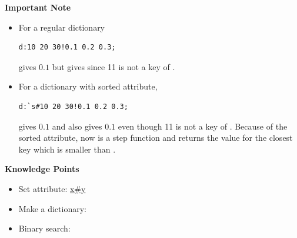 \begin{importantblock}
\textbf{Important Note}
\begin{itemize}
\item For a regular dictionary 
\begin{verbatim}
d:10 20 30!0.1 0.2 0.3;
\end{verbatim}
 gives $0.1$ but  gives  since 11 is not a key of .

\item For a dictionary with sorted attribute,
\begin{verbatim}
d:`s#10 20 30!0.1 0.2 0.3;
\end{verbatim}
 gives $0.1$ and  also gives $0.1$ even though 11 is not a key of . Because of the sorted attribute,  now is a step function and  returns the value for the closest key which is smaller than .
\end{itemize}
\end{importantblock}

\begin{noteblock}
\textbf{Knowledge Points}
\begin{itemize}
\item Set attribute: \href{https://code.kx.com/q/ref/set-attribute/}{x\#y}
\item Make a dictionary: \href{https://code.kx.com/q/ref/dict/#dict}{}
\item Binary search: \href{https://code.kx.com/q/ref/bin/}{}
\end{itemize}
\end{noteblock}


\clearpage
